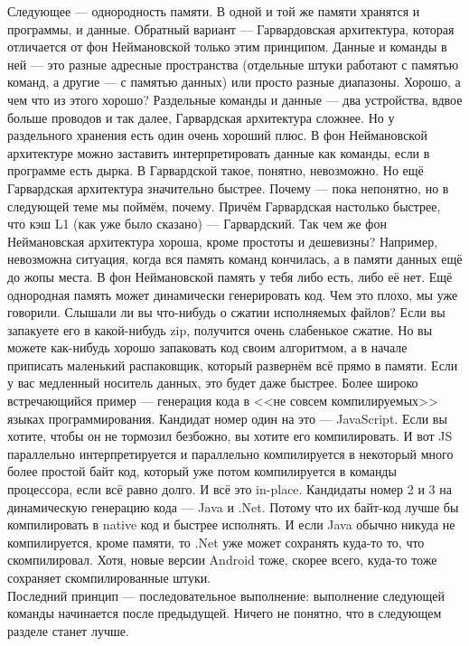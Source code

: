 \documentclass{article}
\begin{document}
    Следующее --- однородность памяти. В одной и той же памяти хранятся и программы, и данные. Обратный вариант --- Гарвардовская архитектура, которая отличается от фон Неймановской только этим принципом. Данные и команды в ней --- это разные адресные пространства (отдельные штуки работают с памятью команд, а другие --- с памятью данных) или просто разные диапазоны. Хорошо, а чем что из этого хорошо? Раздельные команды и данные --- два устройства, вдвое больше проводов и так далее, Гарвардская архитектура сложнее. Но у раздельного хранения есть один очень хороший плюс. В фон Неймановской архитектуре можно заставить интерпретировать данные как команды, если в программе есть дырка. В Гарвардской такое, понятно, невозможно. Но ещё Гарвардская архитектура значительно быстрее. Почему --- пока непонятно, но в следующей теме мы поймём, почему. Причём Гарвардская настолько быстрее, что кэш L1 (как уже было сказано) --- Гарвардский. Так чем же фон Неймановская архитектура хороша, кроме простоты и дешевизны? Например, невозможна ситуация, когда вся память команд кончилась, а в памяти данных ещё до жопы места. В фон Неймановской память у тебя либо есть, либо её нет. Ещё однородная память может динамически генерировать код. Чем это плохо, мы уже говорили. Слышали ли вы что-нибудь о сжатии исполняемых файлов? Если вы запакуете его в какой-нибудь zip, получится очень слабенькое сжатие. Но вы можете как-нибудь хорошо запаковать код своим алгоритмом, а в начале приписать маленький распаковщик, который развернём всё прямо в памяти. Если у вас медленный носитель данных, это будет даже быстрее. Более широко встречающийся пример --- генерация кода в <<не совсем компилируемых>> языках программирования. Кандидат номер один на это --- JavaScript. Если вы хотите, чтобы он не тормозил безбожно, вы хотите его компилировать. И вот JS параллельно интерпретируется и параллельно компилируется в некоторый много более простой байт код, который уже потом компилируется в команды процессора, если всё равно долго. И всё это in-place. Кандидаты номер 2 и 3 на динамическую генерацию кода --- Java и .Net. Потому что их байт-код лучше бы компилировать в native код и быстрее исполнять. И если Java обычно никуда не компилируется, кроме памяти, то .Net уже может сохранять куда-то то, что скомпилировал. Хотя, новые версии Android тоже, скорее всего, куда-то тоже сохраняет скомпилированные штуки.\\
    Последний принцип --- последовательное выполнение: выполнение следующей команды начинается после предыдущей. Ничего не понятно, что в следующем разделе станет лучше.
\end{document}
